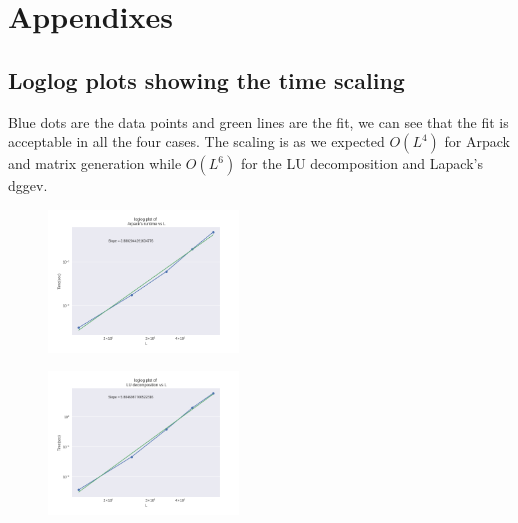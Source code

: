 \documentclass[%
 reprint,
 amsmath,amssymb,
 aps,
]{revtex4-2}
\begin{document}
\section{Appendixes}




\subsection{Loglog plots showing the time scaling \label{appen::loglog_plots}}

Blue dots are the data points and green lines are the fit, we can see that the fit is acceptable in all the four cases. The scaling is as we expected $O(L^4)$ for Arpack and matrix generation while $O(L^6)$ for the LU decomposition and Lapack's dggev.

\begin{figure}[h]
  \centering
  \includegraphics[width=0.45\textwidth]{./images/arpack_loglog.png}
\end{figure}

\begin{figure}[h]
  \centering
  \includegraphics[width=0.45\textwidth]{./images/lu_loglog.png}
\end{figure}
\end{document}
